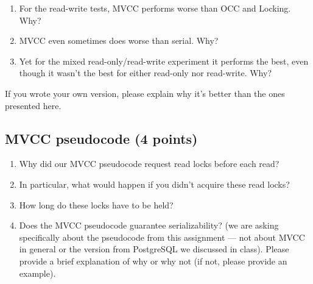 \documentclass[11pt]{article}
\newcommand{\answer}[1]{}
\newcommand{\answer}[1]{{\color{black}\texttt{{a: - #1}}}}
\begin{document}
\begin{enumerate}
\item For the read-write tests, MVCC performs worse than OCC and Locking. Why? \\
\answer{your answer here...}
\vspace{10mm}

\item MVCC even sometimes does worse than serial. Why? \\
\answer{your answer here...}
\vspace{10mm}

\item Yet for the mixed read-only/read-write experiment it performs the best, even though it wasn't the best for either read-only nor read-write. Why? \\
\answer{your answer here...}
\vspace{10mm}

\end{enumerate}

If you wrote your own version, please explain why it's better than the ones presented here.


\subsection{MVCC pseudocode (4 points)}

\begin{enumerate}
\item Why did our MVCC pseudocode request read locks before each read? \\
\answer{your answer here...}
\vspace{10mm}

\item In particular, what would happen if you didn't acquire these read locks? \\
\answer{your answer here...}
\vspace{10mm}

\item How long do these locks have to be held? \\
\answer{your answer here...}
\vspace{10mm}

\item Does the MVCC pseudocode guarantee serializability? (we are asking specifically about the pseudocode from this assignment --- not about MVCC in general or the version from PostgreSQL we discussed in class). Please provide a brief explanation of why or why not (if not, please provide an example). \\
\answer{your answer here...}
\vspace{10mm}

\end{enumerate}
\end{document}
